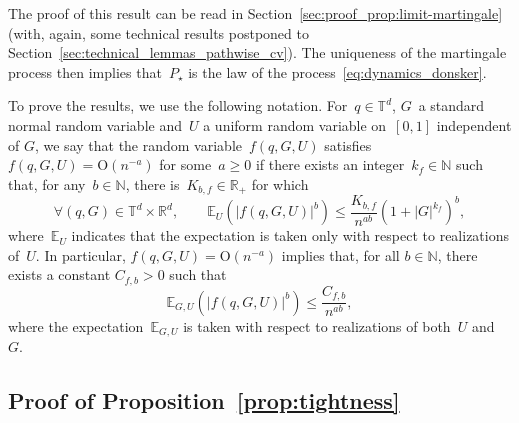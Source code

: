 \documentclass{article}
\newcommand{\R}{\mathbb{R}}
\renewcommand{\leq}{\leqslant}
\renewcommand{\geq}{\geqslant}
\def\N{\mathbb{N}}
\def\R{\mathbb{R}}
\def\T{\mathbb{T}}
\def\E{\mathbb{E}} %
\renewcommand{\dim}{d}
\begin{document}
The proof of this result can be read in Section~\ref{sec:proof_prop:limit-martingale} (with, again, some technical results postponed to Section~\ref{sec:technical_lemmas_pathwise_cv}). The uniqueness of the martingale process then implies that~$P_\star$ is the law of the process~\eqref{eq:dynamics_donsker}.

To prove the results, we use the following notation. For~$q\in\T^\dim$, $G$~a standard normal random variable and~$U$ a uniform random variable on~$[0,1]$ independent of $G$, we say that the random variable~$f(q,G,U)$ satisfies $f(q,G,U) = \mathrm{O}(n^{-a})$ for some~$a \geq 0$ if there exists an integer~$k_f \in\N$ such that, for any~$b \in \mathbb{N}$, there is~$K_{b,f} \in \mathbb{R}_+$ for which 
\begin{equation}
  \label{eq:bound_remainder_f_b}
  \forall (q,G) \in \T^\dim \times \R^\dim, \qquad \E_U\left( |f(q,G,U)|^b \right) \leq \frac{K_{b,f}}{n^{ab}} \left(1+|G|^{k_f}\right)^b,
\end{equation}
where~$\E_U$ indicates that the expectation is taken only with respect to realizations of~$U$. In particular, $f(q,G,U) = \mathrm{O}(n^{-a})$ implies that, for all $b \in \mathbb{N}$, there exists a constant $C_{f,b} > 0$ such that
\[
\E_{G,U}\left(|f(q,G,U)|^b\right) \leq \frac{C_{f,b}}{n^{ab}},
\]
where the expectation~$\E_{G,U}$ is taken with respect to realizations of both~$U$ and~$G$.

\subsection{Proof of Proposition~\ref{prop:tightness}}
\label{sec:proof_prop:tightness}
\end{document}
